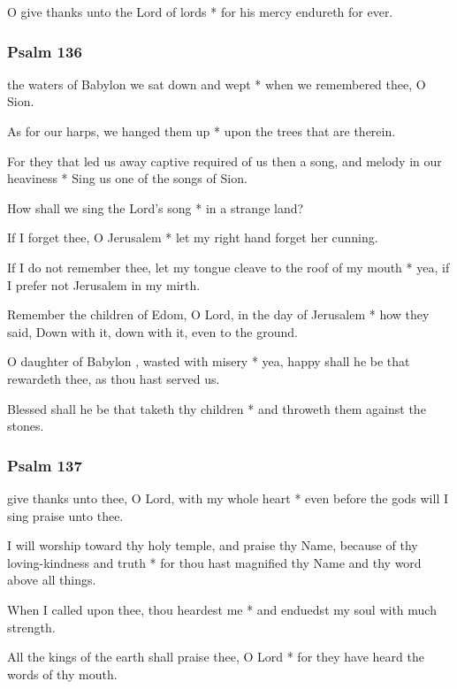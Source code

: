 O give thanks unto the Lord of lords * for his mercy endureth for ever.

\subsubsection{Psalm 136}


 the waters of Babylon we sat down and wept * when we remembered thee, O Sion.

As for our harps, we hanged them up * upon the trees that are therein.

For they that led us away captive required of us then a song, and melody in our heaviness * Sing us one of the songs of Sion.

How shall we sing the Lord's song * in a strange land?

If I forget thee, O Jerusalem * let my right hand forget her cunning.

If I do not remember thee, let my tongue cleave to the roof of my mouth * yea, if I prefer not Jerusalem in my mirth.

Remember the children of Edom, O Lord, in the day of Jerusalem * how they said, Down with it, down with it, even to the ground.

O daughter of Babylon , wasted with misery * yea, happy shall he be that rewardeth thee, as thou hast served us.

Blessed shall he be that taketh thy children * and throweth them against the stones.

\subsubsection{Psalm 137}


 give thanks unto thee, O Lord, with my whole heart * even before the gods will I sing praise unto thee.

I will worship toward thy holy temple, and praise thy Name, because of thy loving-kindness and truth * for thou hast magnified thy Name and thy word above all things.

When I called upon thee, thou heardest me * and enduedst my soul with much strength.

All the kings of the earth shall praise thee, O Lord * for they have heard the words of thy mouth.

